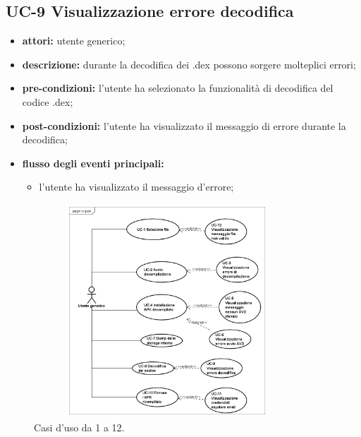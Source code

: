 \subsection*{UC-9 Visualizzazione errore decodifica}\label{subsec:uc-9-visualizzazione-errore-decodifica}
\begin{itemize}
    \item \textbf{attori:} utente generico;
    \item \textbf{descrizione:} durante la decodifica dei .dex possono sorgere molteplici errori;
    \item \textbf{pre-condizioni:} l'utente ha selezionato la funzionalità di decodifica del codice .dex;
    \item \textbf{post-condizioni:} l'utente ha visualizzato il messaggio di errore durante la decodifica;
    \item \textbf{flusso degli eventi principali:}
    \begin{itemize}
        \item l'utente ha visualizzato il messaggio d'errore;
    \end{itemize}
\end{itemize}

\begin{figure}[H]
    \centering
    \includegraphics[width=10cm, height=8cm]{./immagini/usecase/uc_principali.png}
    \caption{Casi d'uso da 1 a 12.}
\end{figure}

